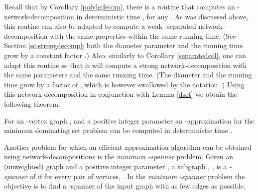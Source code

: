 \documentclass[11pt]{article}
\begin{document}
Recall that by Corollary \ref{polylgdecom}, there is a routine that computes an -network-decomposition in deterministic time , for any . As was discussed above, this routine can also be adapted to compute a weak -separated network-decomposition with the same properties within the same running time. (See Section \ref{sc:strongdecomp}; both the diameter parameter and the running time grow by a constant factor .) Also, similarly to Corollary \ref{separatedcol}, one can adapt this routine so that it will compute a strong network-decomposition with the same parameters and the same running time. (The diameter and the running time grow by a factor of , which is however swallowed by the notation .) Using this network-decomposition in conjunction with Lemma \ref{dset} we obtain the following theorem.
\begin{thm}
For an -vertex graph , and a positive integer parameter  an -approximation for the minimum dominating set problem can be computed in deterministic time .
\end{thm}
Another problem for which an efficient approximation algorithm can be obtained using network-decompositions is the {\em minimum -spanner} problem. Given an (unweighted) graph  and a positive integer parameter , a subgraph , , is a {\em -spanner} of  if for every pair  of vertices, . In the {\em minimum -spanner} problem the objective is to find a -spanner of the input graph with as few edges as possible.
\end{document}
